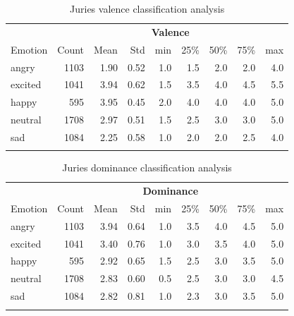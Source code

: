 \begin{table}[H]
\small
\caption{Juries valence classification analysis}
\label{tab:valence}
\centering
    \begin{tabular}{lrrrrrrrr}
        \toprule
        {} & \multicolumn{8}{c}{\textbf{Valence}} \\ \cmidrule{2-9}
        Emotion &    Count &      Mean &       Std &     min &       25\% &      50\% &       75\% &      max \\
        \midrule
        angry   &   1103 &  1.90 &  0.52 &  1.0 &  1.5 &  2.0 &  2.0 &  4.0\\         \addlinespace
        excited &   1041 &  3.94 &  0.62 &  1.5 &  3.5 &  4.0 &  4.5 &  5.5\\         \addlinespace
        happy   &    595 &  3.95 &  0.45 &  2.0 &  4.0 &  4.0 &  4.0 &  5.0\\         \addlinespace
        neutral &   1708 &  2.97 &  0.51 &  1.5 &  2.5 &  3.0 &  3.0 &  5.0\\         \addlinespace
        sad     &   1084 &  2.25 &  0.58 &  1.0 &  2.0 &  2.0 &  2.5 &  4.0\\         \addlinespace
        \bottomrule
    \end{tabular}
\end{table}

\begin{table}[H]
\small
\caption{Juries dominance classification analysis}
\label{tab:dominance}
\centering
    \begin{tabular}{lrrrrrrrr}
        \toprule
        {} & \multicolumn{8}{c}{\textbf{Dominance}} \\ \cmidrule{2-9}
        Emotion &    Count &      Mean &       Std &     min &       25\% &      50\% &       75\% &      max \\
        \midrule
        angry   &    1103 &  3.94 &  0.64 &  1.0 &  3.5 &  4.0 &  4.5 &  5.0\\         \addlinespace
        excited &    1041 &  3.40 &  0.76 &  1.0 &  3.0 &  3.5 &  4.0 &  5.0\\         \addlinespace
        happy   &     595 &  2.92 &  0.65 &  1.5 &  2.5 &  3.0 &  3.5 &  5.0\\         \addlinespace
        neutral &    1708 &  2.83 &  0.60 &  0.5 &  2.5 &  3.0 &  3.0 &  4.5\\         \addlinespace
        sad     &    1084 &  2.82 &  0.81 &  1.0 &  2.3 &  3.0 &  3.5 &  5.0\\         \addlinespace
        \bottomrule
    \end{tabular}
\end{table}


